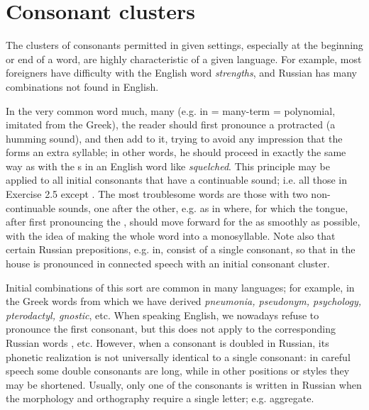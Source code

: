 \section{Consonant clusters}

The clusters of consonants permitted in given settings, especially at the beginning or end of a word, are highly characteristic of a given language. For example, most foreigners have difficulty with the English word \emph{strengths}, and Russian has many combinations not found in English.

In the very common word  much, many (e.g. in  = many-term = polynomial, imitated from the Greek), the reader should first pronounce a protracted  (a humming sound), and then add  to it, trying to avoid any impression that the  forms an extra syllable; in other words, he should proceed in exactly the same way as with the s in an English word like \emph{squelched}. This principle may be applied to all initial consonants that have a continuable sound; i.e. all those in Exercise 2.5 except . The most troublesome words are those with two non-continuable sounds, one after the other, e.g. as in  where, for which the tongue, after first pronouncing the , should move forward for the  as smoothly as possible, with the idea of making the whole word into a monosyllable. Note also that certain Russian prepositions, e.g.  in, consist of a single consonant, so that  in the house is pronounced in connected speech with an initial consonant cluster.

Initial combinations of this sort are common in many languages; for example, in the Greek words from which we have derived \emph{pneumonia, pseudonym, psychology, pterodactyl, gnostic}, etc. When speaking English, we nowadays refuse to pronounce the first consonant, but this does not apply to the corresponding Russian words , etc. However, when a consonant is doubled in Russian, its phonetic realization is not universally identical to a single consonant: in careful speech some double consonants are long, while in other positions or styles they may be shortened. Usually, only one of the consonants is written in Russian when the morphology and orthography require a single letter; e.g.  aggregate.

